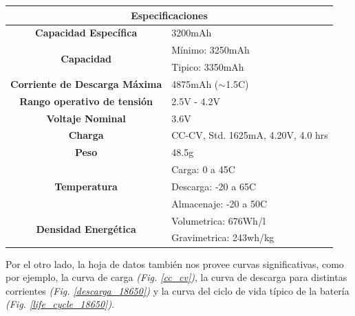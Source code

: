 \documentclass[10pt,a4paper]{article}
\begin{document}
	\begin{table}[h!]
		\begin{center}
			\begin{tabular}{|c|l|}
				\hline
				\multicolumn{2}{|c|}{Especificaciones}                                             \\ \hline
				\textbf{Capacidad Específica}                 & 3200mAh                            \\ \hline
				\multirow{2}{*}{\textbf{Capacidad}}           & Mínimo: 3250mAh                    \\ \cline{2-2} 
				& Tipico: 3350mAh                    \\ \hline
				\textbf{Corriente de Descarga Máxima}         & 4875mAh ($\sim$1.5C)               \\ \hline
				\textbf{Rango operativo de tensión}           & 2.5V - 4.2V                        \\ \hline
				\textbf{Voltaje Nominal}                      & 3.6V                               \\ \hline
				\textbf{Charga}                               & CC-CV, Std. 1625mA, 4.20V, 4.0 hrs \\ \hline
				\textbf{Peso}                                 & 48.5g                              \\ \hline
				\multirow{3}{*}{\textbf{Temperatura}}         & Carga: 0 a 45C                     \\ \cline{2-2} 
				& Descarga: -20 a 65C                \\ \cline{2-2} 
				& Almacenaje: -20 a 50C              \\ \hline
				\multirow{2}{*}{\textbf{Densidad Energética}} & Volumetrica: 676Wh/l               \\ \cline{2-2} 
				& Gravimetrica: 243wh/kg             \\ \hline
			\end{tabular}%
		\end{center}
	\end{table}
	
	Por el otro lado, la hoja de datos también nos provee curvas significativas, como por ejemplo, la curva de carga \emph{(Fig. \ref{cc_cv})}, la curva de descarga para distintas corrientes \emph{(Fig. \ref{descarga_18650})} y la curva del ciclo de vida típico de la batería \emph{(Fig. \ref{life_cycle_18650})}.
	
\end{document}
